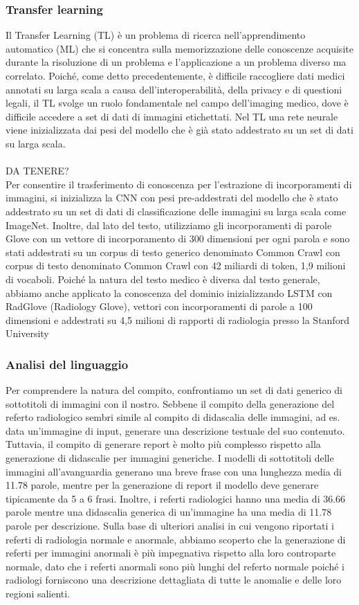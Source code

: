 \documentclass[12pt,a4paper]{report}
\begin{document}
\subsubsection{Transfer learning}
Il Transfer Learning (TL) è un problema di ricerca nell'apprendimento automatico (ML) che si concentra sulla memorizzazione delle conoscenze acquisite durante la risoluzione di un problema e l'applicazione a un problema diverso ma correlato.
Poiché, come detto precedentemente, è difficile raccogliere dati medici annotati su larga scala a causa dell'interoperabilità, della privacy e di questioni legali, il TL svolge un ruolo fondamentale nel campo dell'imaging medico, dove è difficile accedere a set di dati di immagini etichettati. Nel TL una rete neurale viene inizializzata dai pesi del modello che è già stato addestrato su un set di dati su larga scala.
\\\\
DA TENERE?\\
Per consentire il trasferimento di conoscenza per l'estrazione di incorporamenti di immagini, si inizializza la CNN con pesi pre-addestrati del modello che è stato addestrato su un set di dati di classificazione delle immagini su larga scala come ImageNet. Inoltre, dal lato del testo, utilizziamo gli incorporamenti di parole Glove con un vettore di incorporamento di 300 dimensioni per ogni parola e sono stati addestrati su un corpus di testo generico denominato Common Crawl con corpus di testo denominato Common Crawl con 42 miliardi di token, 1,9 milioni di vocaboli.
Poiché la natura del testo medico è diversa dal testo generale, abbiamo anche applicato la conoscenza del dominio inizializzando LSTM con RadGlove (Radiology Glove), vettori con incorporamenti di parole a 100 dimensioni e addestrati su 4,5 milioni di rapporti di radiologia presso la Stanford University


\subsubsection{Analisi del linguaggio}
Per comprendere la natura del compito, confrontiamo un set di dati generico di sottotitoli di immagini con il nostro. Sebbene il compito della generazione del referto radiologico sembri simile al compito di didascalia delle immagini, ad es. data un'immagine di input, generare una descrizione testuale del suo contenuto. Tuttavia, il compito di generare report è molto più complesso rispetto alla generazione di didascalie per immagini generiche.
I modelli di sottotitoli delle immagini all'avanguardia generano una breve frase con una lunghezza media di 11.78 parole, mentre per la generazione di report il modello deve generare tipicamente da 5 a 6 frasi. Inoltre, i referti radiologici hanno una media di 36.66 parole mentre una didascalia generica di un'immagine ha una media di 11.78 parole per descrizione. Sulla base di ulteriori analisi in cui vengono riportati i referti di radiologia normale e anormale, abbiamo scoperto che la generazione di referti per immagini anormali è più impegnativa rispetto alla loro controparte normale, dato che i referti anormali sono più lunghi del referto normale poiché i radiologi forniscono una descrizione dettagliata di tutte le anomalie e delle loro regioni salienti.
\end{document}
